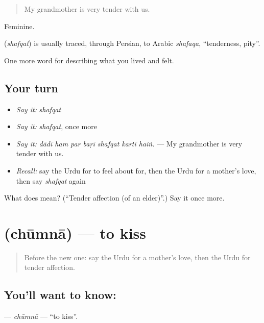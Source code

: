 \begin{quote}
My grandmother is very tender with us.
\end{quote}

Feminine.

\begin{cousinweb}
\textbf{} (\emph{shafqat}) is usually traced, through Persian, to Arabic \emph{shafaqa}, \textquotedblleft{}tenderness, pity\textquotedblright{}.
\end{cousinweb}

\begin{grammarlens}[title={What you've built}]
One more word for describing what you lived and felt.
\end{grammarlens}

\subsection*{Your turn}
\begin{itemize}
\raggedright
  \item \emph{Say it:} \emph{shafqat}
  \item \emph{Say it:} \emph{shafqat}, once more
  \item \emph{Say it:} \emph{dādī ham par baṛī shafqat kartī haiṅ.} — My grandmother is very tender with us.
  \item \emph{Recall:} say the Urdu for to feel about for, then the Urdu for a mother's love, then say \emph{shafqat} again
\end{itemize}

\begin{tcolorbox}[breakable,colback=teal!4,colframe=teal!35!black,title={Before you move on}]
What does  mean? (\textquotedblleft{}Tender affection (of an elder)\textquotedblright{}.) Say it once more.
\end{tcolorbox}
\section[\texorpdfstring{\ur{چومنا} (chūmnā)}{چومنا (chūmnā)}]{ (chūmnā) — to kiss}

\label{lesson:UR-C449-chumna}



\begin{quote}
Before the new one: say the Urdu for a mother's love, then the Urdu for tender affection.
\end{quote}

\subsection*{You'll want to know: }
\textbf{} — \emph{chūmnā} — \textquotedblleft{}to kiss\textquotedblright{}.

